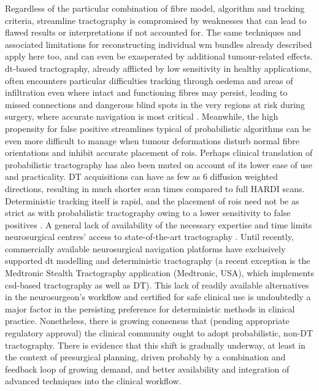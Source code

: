 Regardless of the particular combination of fibre model, algorithm and tracking criteria, streamline tractography is compromised by weaknesses that can lead to flawed results or interpretations if not accounted for\autocite{Rheault2020, Schilling2022, Schilling2019}.
The same techniques and associated limitations for reconstructing individual \gls{wm} bundles already described apply here too, and can even be exasperated by additional tumour-related effects.
\gls{dt}-based tractography, already afflicted by low sensitivity in healthy applications, often encounters particular difficulties tracking through oedema and areas of infiltration even where intact and functioning fibres may persist, leading to missed connections and dangerous blind spots in the very regions at risk during surgery, where accurate navigation is most critical \autocite{Kuhnt2013,Ashmore2020}.
Meanwhile, the high propensity for false positive streamlines typical of probabilistic algorithms can be even more difficult to manage when tumour deformations disturb normal fibre orientations and inhibit accurate placement of \glspl{roi}\autocite{Yang2021}.
Perhaps clinical translation of probabilistic tractography has also been muted on account of its lower ease of use and practicality.
DT acquisitions can have as few as 6 diffusion weighted directions, resulting in much shorter scan times compared to full HARDI scans.
Deterministic tracking itself is rapid, and the placement of \glspl{roi} need not be as strict as with probabilistic tractography owing to a lower sensitivity to false positives \autocite{ODonnell2017}.
A general lack of availability of the necessary expertise and time limits neurosurgical centres' access to state-of-the-art tractography \autocite{Toescu2020}.
Until recently, commercially available neurosurgical navigation platforms have exclusively supported \gls{dt} modelling and deterministic tractography (a recent exception is the Medtronic Stealth\texttrademark{}  Tractography application (Medtronic, USA), which implements \gls{csd}-based tractography\autocite{Pozzilli2023} as well as DT).
This lack of readily available alternatives in the neurosurgeon's workflow and certified for safe clinical use is undoubtedly a major factor in the persisting preference for deterministic methods in clinical practice.
Nonetheless, there is growing consensus that (pending appropriate regulatory approval) the clinical community ought to adopt probabilistic, non-DT tractography\autocite{Yang2021, Beare2022, Petersen2017}.
There is evidence that this shift is gradually underway, at least in the context of presurgical planning\autocite{Toescu2020},  driven probably by a combination and feedback loop of growing demand, and better availability and integration of advanced techniques into the clinical workflow.

